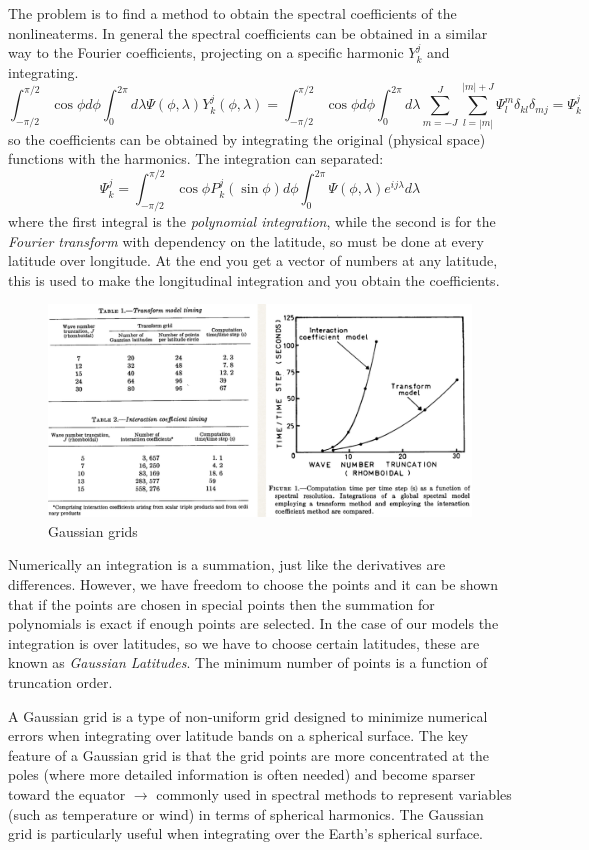 The problem is to find a method to obtain the spectral coefficients of the nonlineaterms. In general the spectral coefficients can be obtained in a similar way to the
Fourier coefficients, projecting on a specific harmonic $Y_k^j$ and integrating.
\[\int_{-\pi/2}^{\pi/2}\cos\phi d\phi\int_0^{2\pi}d\lambda\Psi(\phi,\lambda) Y_k^j(\phi,\lambda)=\int_{-\pi/2}^{\pi/2}\cos\phi d\phi\int_0^{2\pi}d\lambda\displaystyle\sum_{m=-J}^J\displaystyle\sum_{l=|m|}^{|m|+J}\Psi_l^m\delta_{kl}\delta_{mj}=\Psi_k^j\]
so the coefficients can be obtained by integrating the original (physical space) functions with the harmonics. The integration can separated:
\begin{equation}
	\Psi_k^j=\int_{-\pi/2}^{\pi/2}\cos\phi P_k^j(\sin\phi)d\phi\int_0^{2\pi}\Psi(\phi, \lambda)e^{ij\lambda}d\lambda
\end{equation}
where the first integral is the \textit{polynomial integration}, while the second is for the \textit{Fourier transform} with dependency on the latitude, so must be done at every latitude over longitude. At the end you get a vector of numbers at any latitude, this is used to make the longitudinal integration and you obtain the coefficients.

\begin{figure}[h]
	\centering
	\includegraphics[width=0.5\linewidth]{uploads/Screenshot 2024-11-18 100538.png}
	\caption{Gaussian grids}
	\label{fig:gaussian grids}
\end{figure}

Numerically an integration is a summation, just like the derivatives are differences. However, we have freedom to choose the points and it can be shown that if the points are chosen in special points then the summation for polynomials is exact if enough points are selected. In the case of our models the integration is over latitudes, so we have to choose certain latitudes, these are known as \textit{Gaussian Latitudes}. The minimum number of points is a function of truncation order.


A Gaussian grid is a type of non-uniform grid designed to minimize numerical errors when integrating over latitude bands on a spherical surface. The key feature of a Gaussian grid is that the grid points are more concentrated at the poles (where more detailed information is often needed) and become sparser toward the equator $\rightarrow$ commonly used in spectral methods to represent variables (such as temperature or wind) in terms of spherical harmonics. The Gaussian grid is particularly useful when integrating over the Earth's spherical surface.

